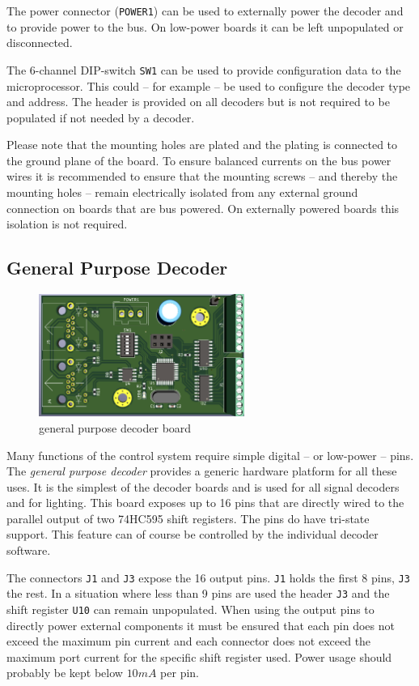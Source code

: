\documentclass{scrreprt}
\begin{document}
The power connector (\texttt{POWER1}) can be used to externally power the decoder and to provide power to the bus.
On low-power boards it can be left unpopulated or disconnected.

The 6-channel DIP-switch \texttt{SW1} can be used to provide configuration data to the microprocessor.
This could -- for example -- be used to configure the decoder type and address.
The header is provided on all decoders but is not required to be populated if not needed by a decoder.

Please note that the mounting holes are plated and the plating is connected to the ground plane of the board.
To ensure balanced currents on the bus power wires it is recommended to ensure that the mounting screws -- and thereby the mounting holes -- remain electrically isolated from any external ground connection on boards that are bus powered.
On externally powered boards this isolation is not required.

\pagebreak
\subsection{General Purpose Decoder}
\begin{figure}[h!]
    \centering
    \includegraphics[width=0.6\textwidth]{common_decoder}
    \caption{general purpose decoder board}
\end{figure}

Many functions of the control system require simple digital -- or low-power -- pins.
The \emph{general purpose decoder} provides a generic hardware platform for all these uses.
It is the simplest of the decoder boards and is used for all signal decoders and for lighting.
This board exposes up to 16 pins that are directly wired to the parallel output of two 74HC595 shift registers.
The pins do have tri-state support.
This feature can of course be controlled by the individual decoder software.

The connectors \texttt{J1} and \texttt{J3} expose the 16 output pins.
\texttt{J1} holds the first 8 pins, \texttt{J3} the rest.
In a situation where less than 9 pins are used the header \texttt{J3} and 
the shift register \texttt{U10} can remain unpopulated.
When using the output pins to directly power external components it must be ensured that each pin does not exceed the maximum pin current and each connector does not exceed the maximum port current for the specific shift register used.
Power usage should probably be kept below $10mA$ per pin.
\end{document}
